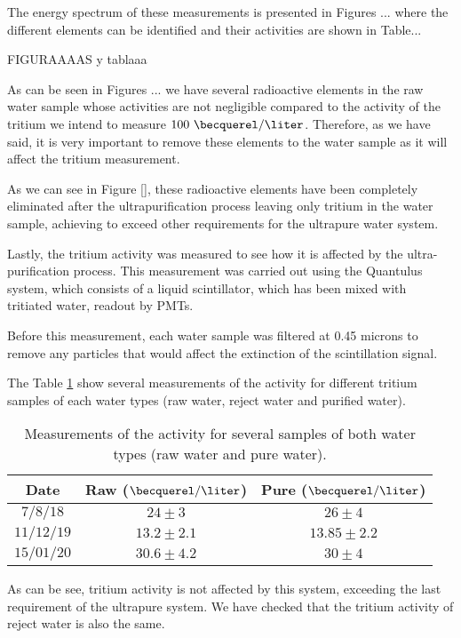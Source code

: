 The energy spectrum of these measurements is presented in Figures ... where the different elements can be identified and their activities are shown in Table...

FIGURAAAAS y tablaaa

As can be seen in Figures ... we have several radioactive elements in the raw water sample whose activities are not negligible compared to the activity of the tritium we intend to measure $100~\becquerel/\liter$. Therefore, as we have said, it is very important to remove these elements to the water sample as it will affect the tritium measurement.

As we can see in Figure \ref{}, these radioactive elements have been completely eliminated after the ultrapurification process leaving only tritium in the water sample, achieving to exceed other requirements for the ultrapure water system.

Lastly, the tritium activity was measured to see how it is affected by the ultra-purification process. This measurement was carried out using the Quantulus system, which consists of a liquid scintillator, which has been mixed with tritiated water, readout by PMTs. 

Before this measurement, each water sample was filtered at 0.45 microns to remove any particles that would affect the extinction of the scintillation signal.

The Table \ref{tab:ActivityTritiumValues} show several measurements of the activity for different tritium samples of each water types (raw water, reject water and purified water).

\begin{table}[htbp]
\begin{center}
\begin{tabular}{|c|c|c|}
\hline
Date & Raw ($\becquerel/\liter$) & Pure ($\becquerel/\liter$) \\
\hline \hline \hline
$7/8/18$ & $24 \pm 3$ & $26 \pm 4$ \\ \hline
$11/12/19$ & $13.2 \pm 2.1$ & $13.85 \pm 2.2$ \\ \hline
$15/01/20$ & $30.6 \pm 4.2$ & $30 \pm 4$ \\ \hline
\end{tabular}
\caption{Measurements of the activity for several samples of both water types (raw water and pure water).}
\label{tab:ActivityTritiumValues}
\end{center}
\end{table}	

As can be see, tritium activity is not affected by this system, exceeding the last requirement of the ultrapure system. We have checked that the tritium activity of reject water is also the same.